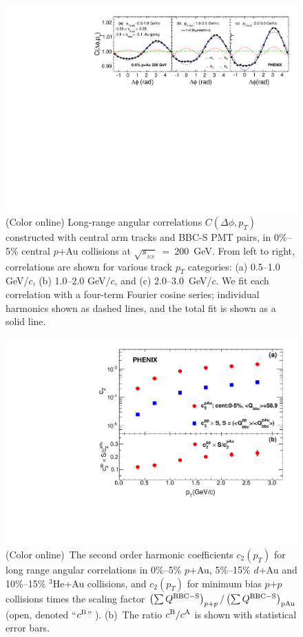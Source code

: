 \documentclass[%
reprint,
showpacs,preprintnumbers,
 amsmath,amssymb,
 aps,
]{revtex4-1}
\newcommand{\pt}{\mbox{$p_T$}\xspace}
\newcommand{\sqsn}{\mbox{$\sqrt{s_{_{NN}}}$}\xspace}
\newcommand{\dau}{\mbox{$d$+Au}\xspace}
\newcommand{\pau}{\mbox{$p$+Au}\xspace}
\newcommand{\hau}{\mbox{$^3\text{He}$+Au}\xspace}
\newcommand{\pp}{\mbox{$p$+$p$}\xspace}
\begin{document}
\begin{figure}[htbp]
  \includegraphics[scale=0.8]{Figures/figure1.pdf}
  \caption{(Color online) Long-range angular correlations $C(\Delta\phi,p_{T})$ constructed with central arm tracks and BBC-S PMT pairs, in 0\%--5\% central \pau collisions at \sqsn~=~200~GeV. From left to right,
correlations are shown for various track \pt categories: (a) 0.5--1.0 GeV/$c$, (b) 1.0--2.0 GeV/$c$, and (c) 2.0--3.0~GeV/$c$. We fit each correlation with a four-term Fourier cosine series; individual harmonics shown as dashed lines, and the total fit is shown as a solid line.}
\label{fig:figure1}
\end{figure}

\begin{figure}[htbp]
  \includegraphics[scale=0.45]{Figures/figure2.pdf}
  \caption{(Color online)~The second order harmonic coefficients $c_2(p_T)$ for long range angular correlations in
0\%--5\% \pau, 5\%--15\% \dau and 10\%--15\% \hau collisions, and
$c_{2}(p_{T})$ for minimum bias \pp collisions times the scaling
factor $\left( \sum Q^{{\rm BBC-S}} \right)_{p+p} / \left( \sum Q^{{\rm
BBC-S}} \right)_{{\rm pAu}}$ (open, denoted ``$c^{{\rm B}}$'' ). (b)~The
ratio $c^{{\rm B}}/c^{{\rm A}}$ is shown with statistical error bars.
}
\label{fig:figure2}
\end{figure}
\end{document}
